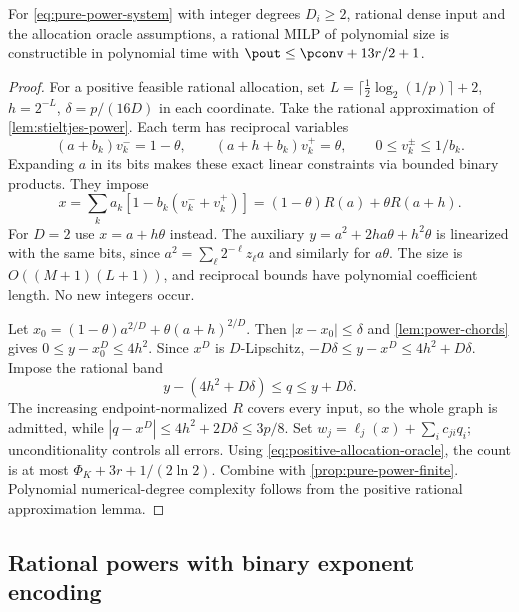 \begin{theorem}\label{thm:reciprocal-powers}
For \eqref{eq:pure-power-system} with integer degrees $D_i\ge2$,
rational dense input and the allocation oracle assumptions, a rational
MILP of polynomial size is constructible in polynomial time with
$\pout\le\pconv+13r/2+1$.
\end{theorem}
\begin{proof}
For a positive feasible rational allocation, set
$L=\lceil\frac12\log_2(1/p)\rceil+2$, $h=2^{-L}$,
$\delta=p/(16D)$ in each coordinate. Take the rational approximation
of \cref{lem:stieltjes-power}. Each term has reciprocal variables
\[
 (a+b_k)v_k^- =1-\theta,\qquad
 (a+h+b_k)v_k^+=\theta,\qquad 0\le v_k^\pm\le1/b_k.
\]
Expanding $a$ in its bits makes these exact linear constraints via
bounded binary products. They impose
\[
 x=\sum_k a_k[1-b_k(v_k^-+v_k^+)]
   =(1-\theta)R(a)+\theta R(a+h).
\]
For $D=2$ use $x=a+h\theta$ instead. The auxiliary
$y=a^2+2ha\theta+h^2\theta$ is linearized with the same bits,
since $a^2=\sum_\ell2^{-\ell}z_\ell a$ and similarly for
$a\theta$. The size is $O((M+1)(L+1))$, and reciprocal bounds
have polynomial coefficient length. No new integers occur.

Let $x_0=(1-\theta)a^{2/D}+\theta(a+h)^{2/D}$.
Then $|x-x_0|\le\delta$ and \cref{lem:power-chords} gives
$0\le y-x_0^D\le4h^2$. Since $x^D$ is $D$-Lipschitz,
$-D\delta\le y-x^D\le4h^2+D\delta$. Impose the rational band
\begin{equation}\label{eq:inverse-power-band}
 y-(4h^2+D\delta)\le q\le y+D\delta.
\end{equation}
The increasing endpoint-normalized $R$ covers every input, so the
whole graph is admitted, while $|q-x^D|\le4h^2+2D\delta\le3p/8$.
Set $w_j=\ell_j(x)+\sum_ic_{ji}q_i$; unconditionality controls
all errors. Using \eqref{eq:positive-allocation-oracle}, the count
is at most $\Phi_K+3r+1/(2\ln2)$. Combine with
\cref{prop:pure-power-finite}. Polynomial numerical-degree complexity
follows from the positive rational approximation lemma.
\end{proof}

\subsection{Rational powers with binary exponent encoding}

